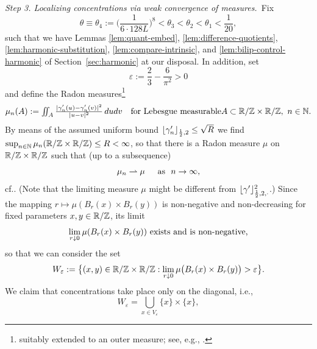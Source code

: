 {\it Step 3. Localizing concentrations via weak convergence of measures.}\,
Fix
\begin{equation}\label{eq:fix-theta}
\textstyle
\theta\equiv \theta_4:=\big(\frac1{6\cdot 128L}\big)^8<\theta_3<\theta_2<
\theta_1<\frac1{20},
\end{equation}
such that we have Lemmas \ref{lem:quant-embed}, 
\ref{lem:difference-quotients}, \ref{lem:harmonic-substitution},
\ref{lem:compare-intrinsic}, and \ref{lem:bilip-control-harmonic}
of Section~\ref{sec:harmonic} at our disposal. In addition, set
\begin{equation}\label{eq:epsilon-choice}
\varepsilon:=\frac23-\frac6{\pi^2}>0
\end{equation}
and define the Radon measures\footnote{suitably extended to
an outer measure; see, e.g., \cite[pp. 13,14]{teschl_2025}.}
\begin{equation}\label{eq:def-radon}
\textstyle
\mu_n(A):=\iint_A\frac{|\g_n'(u)-\g_n'(v)|^2}{|u-v|^2}\,dudv
\quad%
\text{for Lebesgue measurable}
A\subset\R/\Z\times\R/\Z,\,\,n\in\N.
\end{equation}
By means of the assumed uniform bound $\lfloor\gamma_n'\rfloor_{\frac12,2}\le
\sqrt R$ 
we find $\sup_{n\in\mathbb{N}}\mu_n(\mathbb{R}/\mathbb{Z}\times\mathbb{R}/\mathbb{Z})\le R <\infty$,
so that there is a Radon measure $\mu$ on $\mathbb{R}/\mathbb{Z}\times\mathbb{R}/\mathbb{Z}$ such that
(up to a subsequence)
\begin{equation}\label{eq:weak-convergence}
\mu_n\rightharpoonup\mu\quad\,\,\,\text{as }\,\, n\to\infty,
\end{equation}
cf.\@ \cite[Theorem~1.41]{evans-gariepy_2015}. (Note that the limiting
measure $\mu$ might be different from $\lfloor\gamma'\rfloor_{\frac12,2,\cdot}^{2}$.)
Since the mapping $r\mapsto\mu(B_r(x)\times B_r(y))$ is non-negative and 
non-decreasing for fixed parameters $x,y\in\mathbb{R}/\mathbb{Z}$, its limit
\begin{equation}\label{eq:limit-balls}
\textnormal{$\lim_{r\downarrow 0}\mu(B_r(x)\times B_r(y))$ exists and is 
non-negative,}
\end{equation}
so that we can consider the set
\begin{equation}\label{eq:W-eps}
W_\varepsilon:=\big\{ (x,y)\in\mathbb{R}/\mathbb{Z}\times\mathbb{R}/\mathbb{Z}:\lim_{r\downarrow 0}\mu\big(B_r(x)
\times B_r(y)\big)>\varepsilon\big\}.
\end{equation}
We claim that concentrations take place only on the diagonal, i.e.,
\begin{equation}\label{eq:diagonal}
W_\varepsilon=\bigcup_{x\in V_\varepsilon} \{x\}\times\{x\},
\end{equation}
